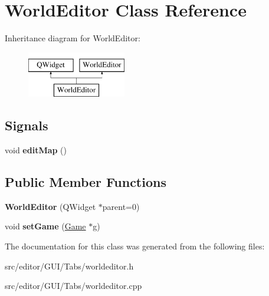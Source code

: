 \hypertarget{class_world_editor}{\section{\-World\-Editor \-Class \-Reference}
\label{class_world_editor}
}
\-Inheritance diagram for \-World\-Editor\-:\begin{figure}[H]
\begin{center}
\leavevmode
\includegraphics[height=2.000000cm]{class_world_editor}
\end{center}
\end{figure}
\subsection*{\-Signals}
\begin{DoxyCompactItemize}
\item 
\hypertarget{class_world_editor_a2f6e4abc9583860b0a0b533e956ed064}{void {\bfseries edit\-Map} ()}\label{class_world_editor_a2f6e4abc9583860b0a0b533e956ed064}

\end{DoxyCompactItemize}
\subsection*{\-Public \-Member \-Functions}
\begin{DoxyCompactItemize}
\item 
\hypertarget{class_world_editor_a92603770ba42ee0fe5e28e28c7ff8ac4}{{\bfseries \-World\-Editor} (\-Q\-Widget $\ast$parent=0)}\label{class_world_editor_a92603770ba42ee0fe5e28e28c7ff8ac4}

\item 
\hypertarget{class_world_editor_a673feffa8f6fb325ed4cea23c6f340ae}{void {\bfseries set\-Game} (\hyperlink{class_game}{\-Game} $\ast$g)}\label{class_world_editor_a673feffa8f6fb325ed4cea23c6f340ae}

\end{DoxyCompactItemize}


\-The documentation for this class was generated from the following files\-:\begin{DoxyCompactItemize}
\item 
src/editor/\-G\-U\-I/\-Tabs/worldeditor.\-h\item 
src/editor/\-G\-U\-I/\-Tabs/worldeditor.\-cpp\end{DoxyCompactItemize}
